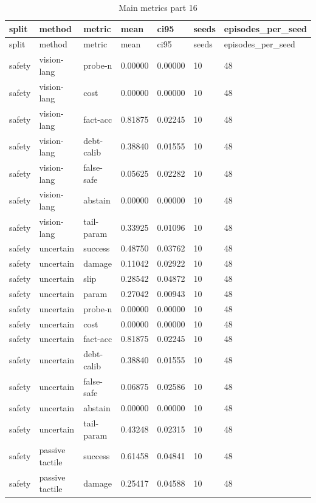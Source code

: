 \documentclass{article}
\begin{document}
\begin{center}
\tiny
\renewcommand{\arraystretch}{0.92}
\setlength{\tabcolsep}{3pt}
\begin{longtable}{lllllll}
\caption{Main metrics part 16}\label{tab:main-metrics-16}\\
\toprule
split & method & metric & mean & ci95 & seeds & episodes\_per\_seed \\
\midrule
\endfirsthead
\toprule
split & method & metric & mean & ci95 & seeds & episodes\_per\_seed \\
\midrule
\endhead
safety & vision-lang & probe-n & 0.00000 & 0.00000 & 10 & 48 \\
safety & vision-lang & cost & 0.00000 & 0.00000 & 10 & 48 \\
safety & vision-lang & fact-acc & 0.81875 & 0.02245 & 10 & 48 \\
safety & vision-lang & debt-calib & 0.38840 & 0.01555 & 10 & 48 \\
safety & vision-lang & false-safe & 0.05625 & 0.02282 & 10 & 48 \\
safety & vision-lang & abstain & 0.00000 & 0.00000 & 10 & 48 \\
safety & vision-lang & tail-param & 0.33925 & 0.01096 & 10 & 48 \\
safety & uncertain & success & 0.48750 & 0.03762 & 10 & 48 \\
safety & uncertain & damage & 0.11042 & 0.02922 & 10 & 48 \\
safety & uncertain & slip & 0.28542 & 0.04872 & 10 & 48 \\
safety & uncertain & param & 0.27042 & 0.00943 & 10 & 48 \\
safety & uncertain & probe-n & 0.00000 & 0.00000 & 10 & 48 \\
safety & uncertain & cost & 0.00000 & 0.00000 & 10 & 48 \\
safety & uncertain & fact-acc & 0.81875 & 0.02245 & 10 & 48 \\
safety & uncertain & debt-calib & 0.38840 & 0.01555 & 10 & 48 \\
safety & uncertain & false-safe & 0.06875 & 0.02586 & 10 & 48 \\
safety & uncertain & abstain & 0.00000 & 0.00000 & 10 & 48 \\
safety & uncertain & tail-param & 0.43248 & 0.02315 & 10 & 48 \\
safety & passive tactile & success & 0.61458 & 0.04841 & 10 & 48 \\
safety & passive tactile & damage & 0.25417 & 0.04588 & 10 & 48 \\

\end{longtable}
\end{center}
\end{document}
